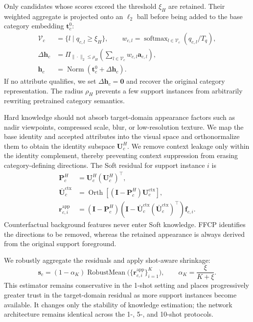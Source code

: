 Only candidates whose scores exceed the threshold $\xi_H$ are retained. Their weighted aggregate is projected onto an $\ell_2$ ball before being added to the base category embedding $\mathbf t_c^0$:
\begin{equation}
\begin{aligned}
\mathcal V_c&=\{l\mid q_{c,l}\geq\xi_H\},\qquad
w_{c,l}=\operatorname{softmax}_{l\in\mathcal V_c}
(q_{c,l}/T_q),\\
\Delta\mathbf h_c
&=\Pi_{\|\cdot\|_2\leq\rho_H}
\left(\sum_{l\in\mathcal V_c}w_{c,l}\mathbf a_{c,l}\right),\\
\mathbf h_c&=\operatorname{Norm}
(\mathbf t_c^0+\Delta\mathbf h_c).
\end{aligned}
\label{eq:hard_anchor}
\end{equation}
If no attribute qualifies, we set $\Delta\mathbf h_c=\mathbf 0$ and recover the original category representation. The radius $\rho_H$ prevents a few support instances from arbitrarily rewriting pretrained category semantics.

Hard knowledge should not absorb target-domain appearance factors such as nadir viewpoints, compressed scale, blur, or low-resolution texture. We map the base identity and accepted attributes into the visual space and orthonormalize them to obtain the identity subspace $\mathbf U_c^H$. We remove context leakage only within the identity complement, thereby preventing context suppression from erasing category-defining directions. The Soft residual for support instance $i$ is
\begin{equation}
\begin{aligned}
\mathbf P_c^H&=\mathbf U_c^H({\mathbf U_c^H})^\top,\\
\bar{\mathbf U}_c^{\mathrm{ctx}}
&=\operatorname{Orth}\!\left[
(\mathbf I-\mathbf P_c^H)\mathbf U_c^{\mathrm{ctx}}
\right],\\
\mathbf r_{c,i}^{\mathrm{app}}
&=(\mathbf I-\mathbf P_c^H)
\left(\mathbf I-\bar{\mathbf U}_c^{\mathrm{ctx}}
({\bar{\mathbf U}_c^{\mathrm{ctx}}})^\top\right)
\mathbf f_{c,i}.
\end{aligned}
\label{eq:soft_residual}
\end{equation}
Counterfactual background features never enter Soft knowledge. FFCP identifies the directions to be removed, whereas the retained appearance is always derived from the original support foreground.

We robustly aggregate the residuals and apply shot-aware shrinkage:
\begin{equation}
\mathbf s_c=(1-\alpha_K)
\operatorname{RobustMean}
\big(\{\mathbf r_{c,i}^{\mathrm{app}}\}_{i=1}^{K}\big),
\qquad
\alpha_K=\frac{\xi}{K+\xi}.
\label{eq:soft_aggregation}
\end{equation}
This estimator remains conservative in the 1-shot setting and places progressively greater trust in the target-domain residual as more support instances become available. It changes only the stability of knowledge estimation; the network architecture remains identical across the 1-, 5-, and 10-shot protocols.

